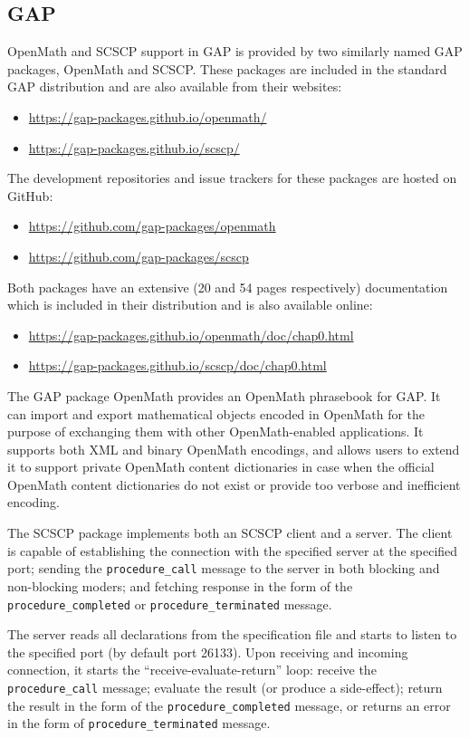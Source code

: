 \documentclass{deliverablereport}
\begin{document}
\subsection{GAP}

OpenMath and SCSCP support in GAP is provided by two similarly named GAP packages, 
{\sf OpenMath} and {\sf SCSCP}. These packages are included in the 
standard GAP distribution and are also available from their 
websites:
\begin{itemize}
\item
\url{https://gap-packages.github.io/openmath/}
\item
\url{https://gap-packages.github.io/scscp/}
\end{itemize}
The development repositories and issue trackers for these packages are hosted on GitHub:
\begin{itemize}
\item
\url{https://github.com/gap-packages/openmath}
\item
\url{https://github.com/gap-packages/scscp}
\end{itemize}
Both packages have an extensive (20 and 54 pages respectively) documentation 
which is included in their distribution and is also available online:
\begin{itemize}
\item
\url{https://gap-packages.github.io/openmath/doc/chap0.html}
\item
\url{https://gap-packages.github.io/scscp/doc/chap0.html}
\end{itemize}

The GAP package OpenMath provides an OpenMath phrasebook for GAP.
It can import and export mathematical objects encoded in OpenMath
for the purpose of exchanging them with other OpenMath-enabled 
applications. It supports both XML and binary OpenMath encodings, 
and allows users to extend it to support private OpenMath content
dictionaries in case when the official OpenMath content dictionaries
do not exist or provide too verbose and inefficient encoding.

The SCSCP package implements both an SCSCP client and a server. 
The client is capable of establishing the connection with the specified server
at the specified port; sending the {\tt procedure\_call} message to
the server in both blocking and non-blocking moders; and fetching
response in the form of the {\tt procedure\_completed} or
{\tt procedure\_terminated} message. 

The server reads all declarations from the specification file and starts
to listen to the specified port (by default port 26133). Upon receiving 
and incoming connection, it starts the ``receive-evaluate-return'' loop:
receive the {\tt procedure\_call} message; evaluate the result 
(or produce a side-effect); return the result in the form of the
{\tt procedure\_completed} message, or returns an error in the form
of {\tt procedure\_terminated} message.
\end{document}
